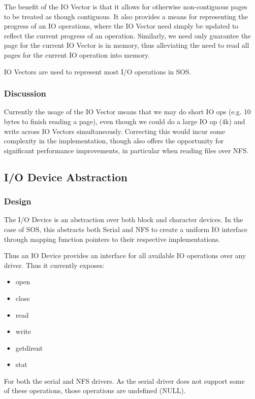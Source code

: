\documentclass[a4paper,12pt]{article}
\begin{document}
The benefit of the IO Vector is that it allows for otherwise non-contiguous
pages to be treated as though contiguous.  It also provides a means for
representing the progress of an IO operations, where the IO Vector need simply
be updated to reflect the current progress of an operation.  Similarly, we
need only guarantee the page for the current IO Vector is in memory, thus
alleviating the need to read all pages for the current IO operation into
memory.

IO Vectors are used to represent most I/O operations in SOS.

\subsubsection{Discussion}
Currently the usage of the IO Vector means that we may do short IO ops
(e.g. 10 bytes to finish reading a page), even though we could do a large IO
op (4k) and write across IO Vectors simultaneously.  Correcting this would
incur some complexity in the implementation, though also offers the
opportunity for significant performance improvements, in particular when
reading files over NFS.


\subsection{I/O Device Abstraction}
\subsubsection{Design}
The I/O Device is an abstraction over both block and character devices.  In
the case of SOS, this abstracts both Serial and NFS to create a uniform IO
interface through mapping function pointers to their respective
implementations.

Thus an IO Device provides an interface for all available IO operations over
any driver.  Thus it currently exposes:

\begin{itemize}
\item open
\item close
\item read
\item write
\item getdirent
\item stat
\end{itemize}

For both the serial and NFS drivers.  As the serial driver does not support
some of these operations, those operations are undefined (NULL).
\end{document}
